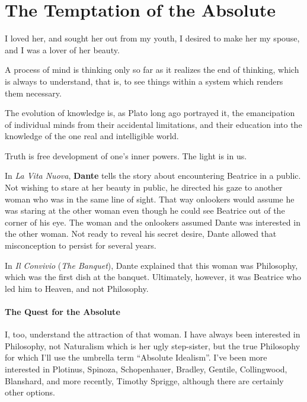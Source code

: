 \section{The Temptation of the Absolute}

\begin{quotex}
I loved her, and sought her out from my youth, I desired to make her my spouse, and I was a lover of her beauty.

A process of mind is thinking only so far as it realizes the end of thinking, which is always to understand, that is, to see things within a system which renders them necessary.

The evolution of knowledge is, as Plato long ago portrayed it, the emancipation of individual minds from their accidental limitations, and their education into the knowledge of the one real and intelligible world.

Truth is free development of one's inner powers. The light is in us.
\end{quotex}


In \emph{La Vita Nuova}, \textbf{Dante} tells the story about encountering Beatrice in a public. Not wishing to stare at her beauty in public, he directed his gaze to another woman who was in the same line of sight. That way onlookers would assume he was staring at the other woman even though he could see Beatrice out of the corner of his eye. The woman and the onlookers assumed Dante was interested in the other woman. Not ready to reveal his secret desire, Dante allowed that misconception to persist for several years.

In \emph{Il Convivio} (\emph{The Banquet}), Dante explained that this woman was Philosophy, which was the first dish at the banquet. Ultimately, however, it was Beatrice who led him to Heaven, and not Philosophy.

\paragraph{The Quest for the Absolute}


I, too, understand the attraction of that woman. I have always been interested in Philosophy, not Naturalism which is her ugly step-sister, but the true Philosophy for which I'll use the umbrella term ``Absolute Idealism''. I've been more interested in Plotinus, Spinoza, Schopenhauer, Bradley, Gentile, Collingwood, Blanshard, and more recently, Timothy Sprigge, although there are certainly other options.

